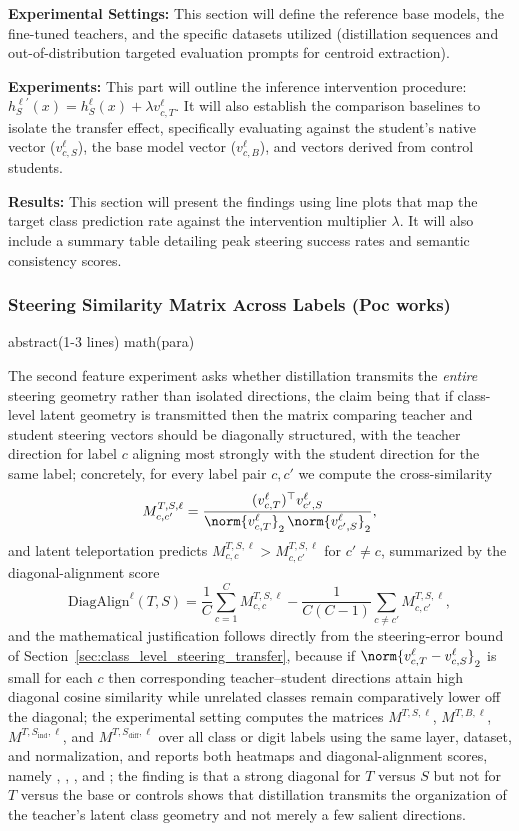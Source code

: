 \textbf{Experimental Settings:} This section will define the reference base models, the fine-tuned teachers, and the specific datasets utilized (distillation sequences and out-of-distribution targeted evaluation prompts for centroid extraction).

\textbf{Experiments:} This part will outline the inference intervention procedure: $h_S^{\ell\prime}(x) = h_S^\ell(x) + \lambda v_{c,T}^\ell$. It will also establish the comparison baselines to isolate the transfer effect, specifically evaluating against the student's native vector ($v_{c,S}^\ell$), the base model vector ($v_{c,B}^\ell$), and vectors derived from control students.

\textbf{Results:} This section will present the findings using line plots that map the target class prediction rate against the intervention multiplier $\lambda$. It will also include a summary table detailing peak steering success rates and semantic consistency scores.

\subsubsection{Steering Similarity Matrix Across Labels (Poc works)}
\label{sec:steering_similarity_matrix}
abstract(1-3 lines)
math(para)

The second feature experiment asks whether distillation transmits the \emph{entire} steering geometry rather than isolated directions, the claim being that if class-level latent geometry is transmitted then the matrix comparing teacher and student steering vectors should be diagonally structured, with the teacher direction for label $c$ aligning most strongly with the student direction for the same label; concretely, for every label pair $c,c'$ we compute the cross-similarity
\[
M_{c,c'}^{T,S,\ell}=
\frac{(v_{c,T}^\ell)^{\top}v_{c',S}^\ell}
{\norm{v_{c,T}^\ell}_2\,\norm{v_{c',S}^\ell}_2},
\]
and latent teleportation predicts $M_{c,c}^{T,S,\ell}>M_{c,c'}^{T,S,\ell}$ for $c'\neq c$, summarized by the diagonal-alignment score
\[
\mathrm{DiagAlign}^{\ell}(T,S)=
\frac{1}{C}\sum_{c=1}^{C}M_{c,c}^{T,S,\ell}
-\frac{1}{C(C-1)}\sum_{c\neq c'}M_{c,c'}^{T,S,\ell},
\]
and the mathematical justification follows directly from the steering-error bound of Section~\ref{sec:class_level_steering_transfer}, because if $\norm{v_{c,T}^\ell-v_{c,S}^\ell}_2$ is small for each $c$ then corresponding teacher--student directions attain high diagonal cosine similarity while unrelated classes remain comparatively lower off the diagonal; the experimental setting computes the matrices $M^{T,S,\ell}$, $M^{T,B,\ell}$, $M^{T,S_{\mathrm{ind}},\ell}$, and $M^{T,S_{\mathrm{diff}},\ell}$ over all class or digit labels using the same layer, dataset, and normalization, and reports both heatmaps and diagonal-alignment scores, namely , , , and ; the finding is that a strong diagonal for $T$ versus $S$ but not for $T$ versus the base or controls shows that distillation transmits the organization of the teacher's latent class geometry and not merely a few salient directions.

